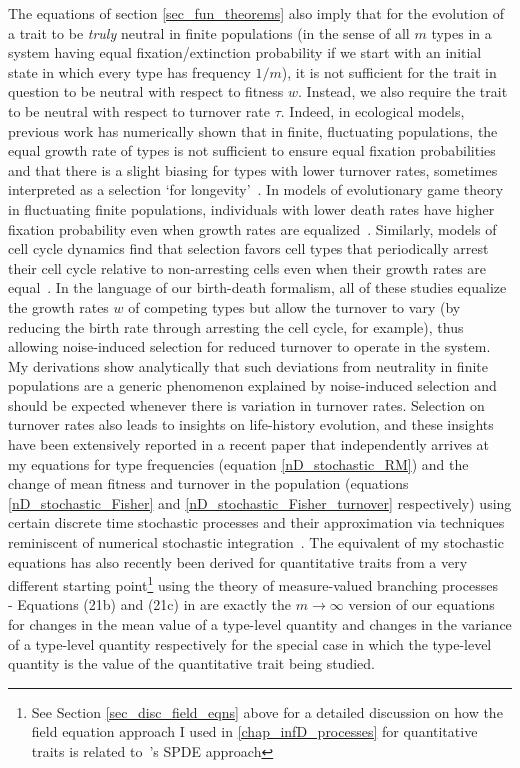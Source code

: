 The equations of section \ref{sec_fun_theorems} also imply that for the evolution of a trait to be \emph{truly} neutral in finite populations (in the sense of all $m$ types in a system having equal fixation/extinction probability if we start with an initial state in which every type has frequency $1/m$), it is not sufficient for the trait in question to be neutral with respect to fitness $w$. Instead, we also require the trait to be neutral with respect to turnover rate $\tau$.  Indeed, in ecological models, previous work has numerically shown that in finite, fluctuating populations, the equal growth rate of types is not sufficient to ensure equal fixation probabilities and that there is a slight biasing for types with lower turnover rates, sometimes interpreted as a selection `for longevity'~\citep{lin_features_2012, oliveira_advantage_2017,balasekaran_quasi-neutral_2022}. In models of evolutionary game theory in fluctuating finite populations, individuals with lower death rates have higher fixation probability even when growth rates are equalized~\citep{huang_stochastic_2015, czuppon_fixation_2018}. Similarly, models of cell cycle dynamics find that selection favors cell types that periodically arrest their cell cycle relative to non-arresting cells even when their growth rates are equal~\citep{wodarz_effect_2017}. In the language of our birth-death formalism, all of these studies equalize the growth rates $w$ of competing types but allow the turnover to vary (by reducing the birth rate through arresting the cell cycle, for example), thus allowing noise-induced selection for reduced turnover to operate in the system. My derivations show analytically that such deviations from neutrality in finite populations are a generic phenomenon explained by noise-induced selection and should be expected whenever there is variation in turnover rates. Selection on turnover rates also leads to insights on life-history evolution, and these insights have been extensively reported in a recent paper that independently arrives at my equations for type frequencies (equation \eqref{nD_stochastic_RM}) and the change of mean fitness and turnover in the population (equations \eqref{nD_stochastic_Fisher} and \eqref{nD_stochastic_Fisher_turnover} respectively) using certain discrete time stochastic processes and their approximation via techniques reminiscent of numerical stochastic integration~\citep{kuosmanen_turnover_2022}. The equivalent of my stochastic equations has also recently been derived for quantitative traits from a very different starting point\footnote{See Section \ref{sec_disc_field_eqns} above for a detailed discussion on how the field equation approach I used in \ref{chap_infD_processes} for quantitative traits is related to~\cite{week_white_2021}'s SPDE approach} using the theory of measure-valued branching processes~\citep{week_white_2021} - Equations (21b) and (21c) in \cite{week_white_2021} are exactly the $m \to \infty$ version of our equations for changes in the mean value of a type-level quantity and changes in the variance of a type-level quantity respectively for the special case in which the type-level quantity is the value of the quantitative trait being studied.

